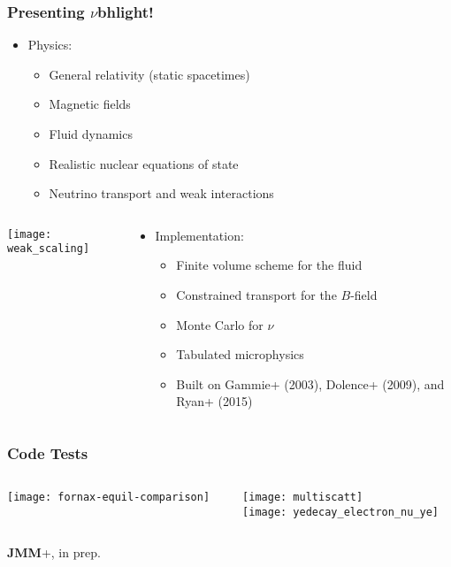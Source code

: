 \documentclass[]{beamer}
\begin{document}
\begin{frame}
  \frametitle{Presenting $\nu$bhlight!}
  \begin{itemize}
  \item Physics:
    \begin{itemize}
    \item General relativity (static spacetimes)
    \item Magnetic fields
    \item Fluid dynamics
    \item Realistic nuclear equations of state
    \item Neutrino transport and weak interactions
    \end{itemize}
  \end{itemize}
  \begin{columns}
    \begin{column}{6cm}
      \begin{center}
        \texttt{[image: weak\_scaling]}
      \end{center}
    \end{column}
    \begin{column}{6cm}
      \begin{itemize}
      \item Implementation:
        \begin{itemize}
        \item Finite volume scheme for the fluid
        \item Constrained transport for the $B$-field
        \item Monte Carlo for $\nu$
        \item Tabulated microphysics
        \item Built on Gammie+ (2003), Dolence+ (2009),  and Ryan+  (2015)
        \end{itemize}
      \end{itemize}
    \end{column}
  \end{columns}
\end{frame}

\begin{frame}
  \frametitle{Code Tests}
  \begin{columns}
    \begin{column}{6cm}
      \centering
      \texttt{[image: fornax-equil-comparison]}
    \end{column}
    \begin{column}{6cm}
      \centering
      \texttt{[image: multiscatt]}\\
      \texttt{[image: yedecay\_electron\_nu\_ye]}
    \end{column}
  \end{columns}
  \textbf{JMM}+, in prep.
\end{frame}
\end{document}
